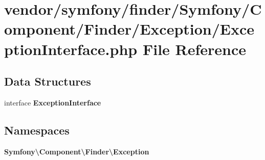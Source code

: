 \section{vendor/symfony/finder/\+Symfony/\+Component/\+Finder/\+Exception/\+Exception\+Interface.php File Reference}
\label{symfony_2finder_2_symfony_2_component_2_finder_2_exception_2_exception_interface_8php}
\subsection*{Data Structures}
\begin{DoxyCompactItemize}
\item 
interface {\bf Exception\+Interface}
\end{DoxyCompactItemize}
\subsection*{Namespaces}
\begin{DoxyCompactItemize}
\item 
 {\bf Symfony\textbackslash{}\+Component\textbackslash{}\+Finder\textbackslash{}\+Exception}
\end{DoxyCompactItemize}
